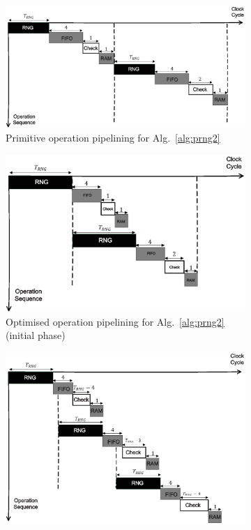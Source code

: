\documentclass[runningheads]{llncs}
\begin{document}
\begin{figure}[!tb]
\centering
\begin{subfigure}[t]{0.45\textwidth}\centering
\includegraphics[width=\textwidth]{./fig/pipeline_rng.eps}
\caption{Primitive operation pipelining for Alg.~\ref{alg:prng2}}
\label{fig:pipeline_rng}
\end{subfigure}
\hspace{1em}
\begin{subfigure}[t]{0.45\textwidth}\centering
\includegraphics[width=\textwidth]{./fig/pipeline_rng2.eps}
\caption{Optimised operation pipelining for Alg.~\ref{alg:prng2} (initial phase) }
\label{fig:pipeline_rng2}
\end{subfigure}
\begin{subfigure}[t]{0.45\textwidth}\centering
\includegraphics[width=\textwidth]{./fig/pipeline_rng3.eps}

\end{subfigure}
\end{figure}
\end{document}
